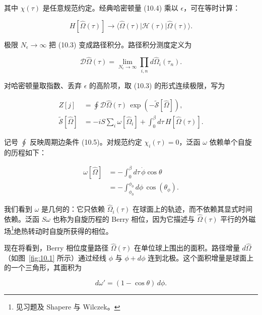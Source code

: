 其中 $\chi(\tau)$ 是任意规范约定。经典哈密顿量 (10.4) 乘以 $\epsilon$，可在等时计算：

\begin{equation*}
H [ \hat {\Omega} ( \tau ) ] \rightarrow \langle \hat {\Omega} ( \tau ) | \mathcal {H} ( \tau ) | \hat {\Omega} ( \tau ) \rangle .
\tag{10.8}
\end{equation*}

极限 $N_{\epsilon} \rightarrow \infty$ 把 (10.3) 变成路径积分。路径积分测度定义为

\begin{equation*}
\mathcal {D} \hat {\Omega} ( \tau ) = \lim _ {N _ {\epsilon} \rightarrow \infty} \prod_ {i, n} d \hat {\Omega} _ {i} ( \tau _ {n} ).
\tag{10.9}
\end{equation*}

对哈密顿量取指数、丢弃 $\epsilon$ 的高阶项，取 (10.3) 的形式连续极限，写为

\begin{align*}
Z [ j ] & = \oint \mathcal {D} \hat {\Omega} ( \tau ) \, \exp \left( - \tilde {\mathcal {S}} [ \hat {\Omega} ] \right) ,\\
\tilde {\mathcal {S}} [ \hat {\Omega} ] & = - i S \sum_ {i} \omega [ \hat {\Omega} _ {i} ] + \int_ {0} ^ {\beta} d \tau \, H [ \hat {\Omega} ( \tau ) ] .
\tag{10.10}
\end{align*}

记号 $\oint$ 反映周期边条件 (10.5)。对规范约定 $\chi_{i}(\tau)=0$，泛函 $\omega$ 依赖单个自旋的历程如下：

\begin{align*}
\omega [ \hat {\Omega} ] & = - \int_ {0} ^ {\beta} d \tau \, \dot {\phi} \cos \theta\\
& = - \int_ {\phi_ {0}} ^ {\phi_ {0}} d \phi \, \cos ( \theta_ {\phi} ) .
\tag{10.11}
\end{align*}

我们看到 $\omega$ 是几何的：它只依赖 $\hat{\Omega}_{i}(\tau)$ 在球面上的轨迹，而不依赖其显式时间依赖。泛函 $S\omega$ 也称为自旋历程的 Berry 相位，因为它描述与 $\hat{\Omega}(\tau)$ 平行的外磁场\footnote{见习题及 Shapere 与 Wilczek。}绝热转动时自旋所获得的相位。

现在将看到，Berry 相位度量路径 $\hat{\Omega}(\tau)$ 在单位球上围出的面积。路径增量 $d\hat{\Omega}$（如图~\ref{fig:10.1} 所示）通过经线 $\phi$ 与 $\phi + d\phi$ 连到北极。这个面积增量是球面上的一个三角形，其面积为

\begin{equation*}
d \omega ' = ( 1 - \cos \theta ) \, d \phi .
\tag{10.12}
\end{equation*}

